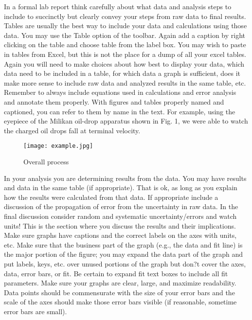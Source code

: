 \documentclass[11PT, a4paper]{article}
\begin{document}
In a formal lab report think carefully about what data and analysis steps to include to succinctly
but clearly convey your steps from raw data to final results. Tables are usually the best way to
include your data and calculations using those data. You may use the Table option of the toolbar.
Again add a caption by right clicking on the table and choose table from the label box. You may
wish to paste in tables from Excel, but this is not the place for a dump of all your excel tables.
Again you will need to make choices about how best to display your data, which data need to be
included in a table, for which data a graph is sufficient, does it make more sense to include raw
data and analyzed results in the same table, etc. Remember to always include equations used in
calculations and error analysis and annotate them properly. With figures and tables properly
named and captioned, you can refer to them by name in the text. For example, using the eyepiece 
of the Milikan oil-drop apparatus shown in Fig. 1, we were able to watch the charged oil drops
fall at terminal velocity.\\

\begin{figure}[h!]
\centering
\texttt{[image: example.jpg]}
\caption{Overall process}
\label{fig:method}
\end{figure}


In your analysis you are determining results from the data. You may have results and data in the
same table (if appropriate). That is ok, as long as you explain how the results were calculated
from that data. If appropriate include a discussion of the propagation of error from the
uncertainty in raw data. In the final discussion consider random and systematic
uncertainty/errors and watch units! This is the section where you discuss the results and their
implications.\\

Make sure graphs have captions and the correct labels on the axes with units, etc. Make sure that
the business part of the graph (e.g., the data and fit line) is the major portion of the figure; you
may expand the data part of the graph and put labels, keys, etc. over unused portions of the graph
but don?t cover the axes, data, error bars, or fit. Be certain to expand fit text boxes to include all
fit parameters. Make sure your graphs are clear, large, and maximize readability. Data points
should be commensurate with the size of your error bars and the scale of the axes should make
those error bars visible (if reasonable, sometime error bars are small). \\
\end{document}
